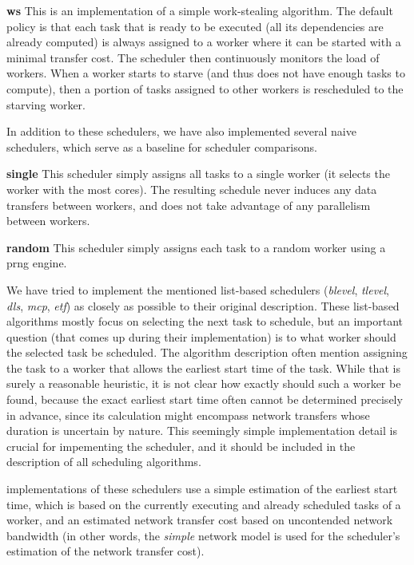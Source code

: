 \noindent\textbf{ws}\quad
This is an implementation of a simple work-stealing algorithm. The default policy is that each task
that is ready to be executed (all its dependencies are already computed) is always assigned to a
worker where it can be started with a minimal transfer cost. The scheduler then continuously
monitors the load of workers. When a worker starts to starve (and thus does not have enough tasks
to compute), then a portion of tasks assigned to other workers is rescheduled to the starving
worker.

In addition to these schedulers, we have also implemented several naive schedulers, which serve as
a baseline for scheduler comparisons.

\noindent\textbf{single}\quad
This scheduler simply assigns all tasks to a single worker (it selects the worker with the most
cores). The resulting schedule never induces any data transfers between workers, and does not take
advantage of any parallelism between workers.

\noindent\textbf{random}\quad
This scheduler simply assigns each task to a random worker using a \gls{prng} engine.

We have tried to implement the mentioned list-based schedulers (\emph{blevel},
\emph{tlevel}, \emph{dls}, \emph{mcp}, \emph{etf})
as closely as possible to their original description. These list-based algorithms mostly focus on
selecting the next task to schedule, but an important question (that comes up during their
implementation) is to what worker should the selected task be scheduled. The algorithm description
often mention assigning the task to a worker that allows the earliest start time of the task. While
that is surely a reasonable heuristic, it is not clear how exactly should such a worker be found,
because the exact earliest start time often cannot be determined precisely in advance, since its
calculation might encompass network transfers whose duration is uncertain by nature. This seemingly
simple implementation detail is crucial for impementing the scheduler, and it should be included in
the description of all scheduling algorithms.

\estee{} implementations of these schedulers use a simple estimation of the earliest
start time, which is based on the currently executing and already scheduled tasks of a worker, and
an estimated network transfer cost based on uncontended network bandwidth (in other words, the
\emph{simple} network model is used for the scheduler's estimation of the network
transfer cost).

